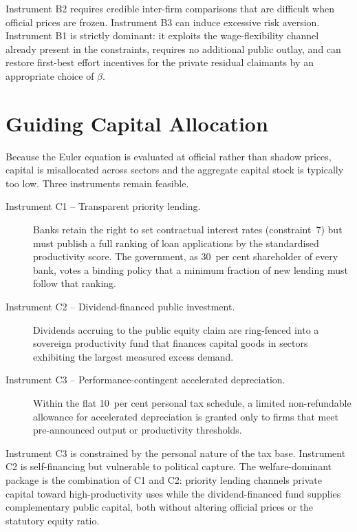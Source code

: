 \documentclass[12pt,anyside]{book}
\theoremstyle{definition}
\theoremstyle{plain}
\theoremstyle{remark}
\begin{document}
Instrument B2 requires credible inter-firm comparisons that are difficult when official prices are frozen. Instrument B3 can induce excessive risk aversion. Instrument B1 is strictly dominant: it exploits the wage-flexibility channel already present in the constraints, requires no additional public outlay, and can restore first-best effort incentives for the private residual claimants by an appropriate choice of $\beta$.

\section{Guiding Capital Allocation}

Because the Euler equation is evaluated at official rather than shadow prices, capital is misallocated across sectors and the aggregate capital stock is typically too low. Three instruments remain feasible.

\begin{description}
\item[Instrument C1 -- Transparent priority lending.]  
Banks retain the right to set contractual interest rates (constraint~7) but must publish a full ranking of loan applications by the standardised productivity score. The government, as 30~per cent shareholder of every bank, votes a binding policy that a minimum fraction of new lending must follow that ranking.

\item[Instrument C2 -- Dividend-financed public investment.]  
Dividends accruing to the public equity claim are ring-fenced into a sovereign productivity fund that finances capital goods in sectors exhibiting the largest measured excess demand.

\item[Instrument C3 -- Performance-contingent accelerated depreciation.]  
Within the flat 10~per cent personal tax schedule, a limited non-refundable allowance for accelerated depreciation is granted only to firms that meet pre-announced output or productivity thresholds.
\end{description}

Instrument C3 is constrained by the personal nature of the tax base. Instrument C2 is self-financing but vulnerable to political capture. The welfare-dominant package is the combination of C1 and C2: priority lending channels private capital toward high-productivity uses while the dividend-financed fund supplies complementary public capital, both without altering official prices or the statutory equity ratio.
\end{document}
